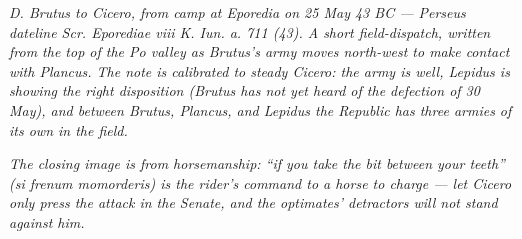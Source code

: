 
\textit{D. Brutus to Cicero, from camp at Eporedia on 25 May 43
BC --- Perseus dateline \textit{Scr. Eporediae viii K. Iun. a.
711 (43)}. A short field-dispatch, written from the top of
the Po valley as Brutus's army moves north-west to make
contact with Plancus. The note is calibrated to steady
Cicero: the army is well, Lepidus is showing the right
disposition (Brutus has not yet heard of the defection of
30 May), and between Brutus, Plancus, and Lepidus the
Republic has three armies of its own in the field.}

\textit{The closing image is from horsemanship: ``if you
take the bit between your teeth'' (\textit{si frenum
momorderis}) is the rider's command to a horse to charge ---
let Cicero only press the attack in the Senate, and the
optimates' detractors will not stand against him.}

